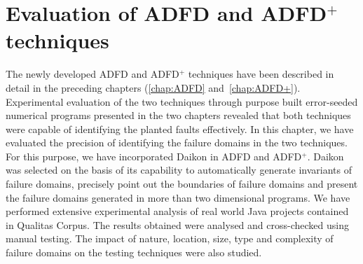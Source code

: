 
\chapter{Evaluation of ADFD and ADFD$^+$ techniques}
\label{chap:Evaluation}
	
The newly developed ADFD and ADFD$^+$ techniques have been described in detail in the preceding chapters (\ref{chap:ADFD} and~\ref{chap:ADFD+}). Experimental evaluation of the two techniques through purpose built error-seeded numerical programs presented in the two chapters revealed that both techniques were capable of identifying the planted faults effectively. In this chapter, we have evaluated the precision of identifying the failure domains in the two techniques. For this purpose, we have incorporated Daikon in ADFD and ADFD$^+$. Daikon was selected on the basis of its capability to automatically generate invariants of failure domains, precisely point out the boundaries of failure domains and present the failure domains generated in more than two dimensional programs. We have performed extensive experimental analysis of real world Java projects contained in Qualitas Corpus. The results obtained were analysed and cross-checked using manual testing. The impact of nature, location, size, type and complexity of failure domains on the testing techniques were also studied. 




  





